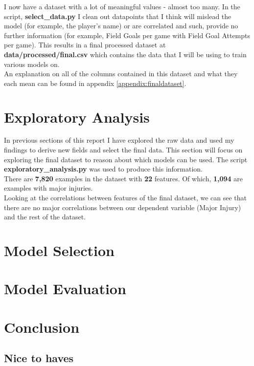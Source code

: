 \documentclass{article}
\begin{document}
I now have a dataset with a lot of meaningful values - almost too many. In the script,
\textbf{select\_data.py} I clean out datapoints that I think will mislead the model (for example, the
player's name) or are correlated and such, provide no further information (for example, Field Goals per game with Field
Goal Attempts per game).
This results in a final processed dataset at \textbf{data/processed/final.csv} which contains the
data that I will be using to train various models on.\\

An explanation on all of the columns contained in this dataset and what they each
mean can be found in appendix \ref{appendix:finaldataset}.

\section*{Exploratory Analysis}

In previous sections of this report I have explored the raw data and 
used my findings to derive new fields and select the final data.
This section will focus on exploring the final dataset to reason about which
models can be used. The script \textbf{exploratory\_analysis.py} was
used to produce this information.\\

There are \textbf{7,820} examples in the dataset with \textbf{22} features. Of which,
\textbf{1,094} are examples with major injuries.\\ Looking at the correlations between
features of the final dataset, we can see that there are no major 
correlations between our dependent variable (Major Injury) and the 
rest of the dataset.

\section*{Model Selection}



\section*{Model Evaluation}

\section*{Conclusion}

\subsection*{Nice to haves}
\end{document}
